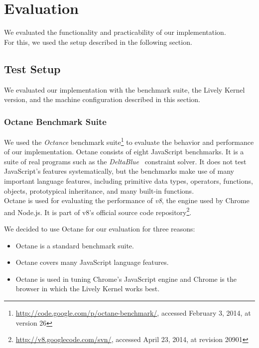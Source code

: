 \chapter{Evaluation} \label{chapter:EVALUATION}

We evaluated the functionality and practicability of our implementation.\\
For this, we used the setup described in the following section.


\section{Test Setup} \label{sec:EVALUATION:1}

We evaluated our implementation with the benchmark suite, the Lively Kernel version, and the machine configuration described in this section.

\subsection{Octane Benchmark Suite}

We used the \emph{Octance} benchmark suite\footnote{\url{http://code.google.com/p/octane-benchmark/}, accessed February 3, 2014, at version 26} to evaluate the behavior and performance of our implementation.
Octane consists of eight JavaScript benchmarks.
It is a suite of real programs such as the \emph{DeltaBlue}~\cite{FreemanBenson1990ICS} constraint solver.
It does not test JavaScript's features systematically, but the benchmarks make use of many important language features, including primitive data types, operators, functions, objects, prototypical inheritance, and many built-in functions.\\
Octane is used for evaluating the performance of \emph{v8}, the engine used by Chrome and Node.js.
It is part of v8's official source code repository\footnote{\url{http://v8.googlecode.com/svn/}, accessed April 23, 2014, at revision 20901}.

We decided to use Octane for our evaluation for three reasons:

\begin{itemize}
    \item Octane is a standard benchmark suite.
    \item Octane covers many JavaScript language features.
    \item Octane is used in tuning Chrome's JavaScript engine and Chrome is the browser in which the Lively Kernel works best.
\end{itemize}


